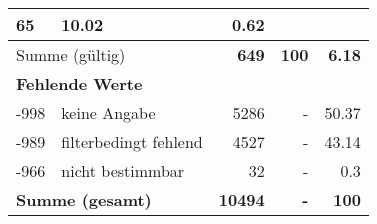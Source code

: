\begin{longtable}{lXrrr}
       \num{65} &
       \num[round-mode=places,round-precision=2]{10,02} &
         \num[round-mode=places,round-precision=2]{0,62} \\
     \midrule
     \multicolumn{2}{l}{Summe (gültig)} &
       \textbf{\num{649}} &
     \textbf{100} &
       \textbf{\num[round-mode=places,round-precision=2]{6,18}} \\
     \multicolumn{5}{l}{\textbf{Fehlende Werte}}\\
       -998 &
       keine Angabe &
         \num{5286} &
        - &
         \num[round-mode=places,round-precision=2]{50,37} \\
       -989 &
       filterbedingt fehlend &
         \num{4527} &
        - &
         \num[round-mode=places,round-precision=2]{43,14} \\
       -966 &
       nicht bestimmbar &
         \num{32} &
        - &
         \num[round-mode=places,round-precision=2]{0,3} \\
     \midrule
     \multicolumn{2}{l}{\textbf{Summe (gesamt)}} &
          \textbf{\num{10494}} &
        \textbf{-} &
        \textbf{100} \\
     \bottomrule
     \end{longtable}
     
